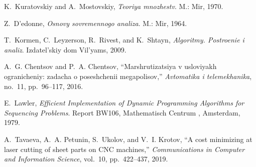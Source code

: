 \begin{thebibliography}{10}
K.~Kuratovskiy and A.~Mostovskiy, {\em Teoriya mnozhestv}.
\newblock M.: Mir, 1970.

Z.~D'edonne, {\em Osnovy sovremennogo analiza}.
\newblock M.: Mir, 1964.

T.~Kormen, C.~Leyzerson, R.~Rivest, and K.~Shtayn, {\em Algoritmy. Postroenie i
  analiz}.
\newblock Izdatel'skiy dom Vil'yams, 2009.

A.~G. Chentsov and P.~A. Chentsov, ``Marshrutizatsiya v usloviyakh
  ogranicheniy: zadacha o poseshchenii megapolisov,'' {\em Avtomatika i
  telemekhanika}, no.~11, pp.~96--117, 2016.

E.~Lawler, {\em Efficient Implementation of Dynamic Programming Algorithms for
  Sequencing Problems}.
\newblock Report BW106, Mathematisch Centrum , Amsterdam, 1979.

A.~Tavaeva, A.~A. Petunin, S.~Ukolov, and V.~I. Krotov, ``A cost minimizing at
  laser cutting of sheet parts on {{CNC}} machines,'' {\em Communications in
  Computer and Information Science}, vol.~10, pp.~422--437, 2019.

\end{thebibliography}
